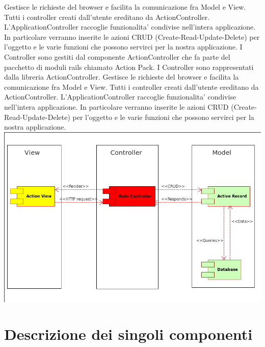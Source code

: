 \documentclass[11pt,a4paper]{article}
\begin{document}
Gestisce le richieste del browser e facilita la comunicazione fra Model e View. Tutti i controller creati dall'utente ereditano da ActionController. L'ApplicationController raccoglie funzionalita' condivise nell'intera applicazione.
In particolare verranno inserite le azioni CRUD (Create-Read-Update-Delete) per l'oggetto e le varie funzioni che possono servirci per la nostra applicazione.
I Controller sono gestiti dal componente ActionController che fa parte del pacchetto di moduli rails chiamato Action Pack.
I Controller sono rappresentati dalla libreria ActionController.
Gestisce le richieste del browser e facilita la comunicazione fra Model e View. Tutti i controller creati dall'utente ereditano da ActionController. L'ApplicationController raccoglie funzionalita' condivise nell'intera applicazione.
In particolare verranno inserite le azioni CRUD (Create-Read-Update-Delete) per l'oggetto e le varie funzioni che possono servirci per la nostra applicazione.
\includegraphics[scale=0.50]{images/SIGEOL.png}


\section{Descrizione dei singoli componenti}
\end{document}
